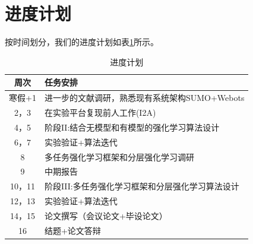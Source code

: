 \documentclass[degree=bachelor, tocarialchapter, pifootnote]{thuthesis}
\begin{document}
\section{进度计划}
  按时间划分，我们的进度计划如表\ref{table:plan}所示。
  \begin{table}[h!]
  \centering
  \caption{进度计划}
  \label{table:plan}
  \begin{tabular}[c]{|c||p{10cm}|}
  \hline
  \textbf{周次} & \textbf{任务安排}\\
  \hline
  寒假+1   & 进一步的文献调研，熟悉现有系统架构SUMO+Webots \\ \hline
  2，3   & 在实验平台复现前人工作(I2A\cite{I2A}) \\ \hline
  4，5   & 阶段II:结合无模型和有模型的强化学习算法设计\\ \hline
  6，7   & 实验验证+算法迭代\\ \hline
  8     & 多任务强化学习框架和分层强化学习调研\\ \hline
  9   & 中期报告\\ \hline
  10，11   & 阶段III:多任务强化学习框架和分层强化学习算法设计\\ \hline
  12，13   & 实验验证+算法迭代\\ \hline
  14，15   & 论文撰写（会议论文+毕设论文）\\ \hline
  16   & 结题+论文答辩\\
  \hline
  \end{tabular}
  \end{table}


\backmatter




% 



%

%

%

%
\end{document}
